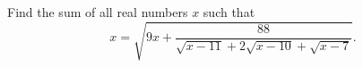 Find the sum of all real numbers $x$ such that
\[x=\sqrt{9x+\dfrac{88}{\sqrt{x-11}+2\sqrt{x-10}+\sqrt{x-7}}}.\]
